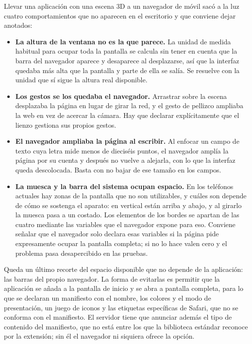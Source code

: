 Llevar una aplicación con una escena 3D a un navegador de móvil sacó a la luz cuatro
comportamientos que no aparecen en el escritorio y que conviene dejar anotados:

\begin{itemize}
	\item \textbf{La altura de la ventana no es la que parece.} La unidad de medida habitual para
		ocupar toda la pantalla se calcula sin tener en cuenta que la barra del navegador aparece y
		desaparece al desplazarse, así que la interfaz quedaba más alta que la pantalla y parte de
		ella se salía. Se resuelve con la unidad que sí sigue la altura real disponible.
	\item \textbf{Los gestos se los quedaba el navegador.} Arrastrar sobre la escena desplazaba la
		página en lugar de girar la red, y el gesto de pellizco ampliaba la web en vez de acercar la
		cámara. Hay que declarar explícitamente que el lienzo gestiona sus propios gestos.
	\item \textbf{El navegador ampliaba la página al escribir.} Al enfocar un campo de texto cuya
		letra mide menos de dieciséis puntos, el navegador amplía la página por su cuenta y después
		no vuelve a alejarla, con lo que la interfaz queda descolocada. Basta con no bajar de ese
		tamaño en los campos.
	\item \textbf{La muesca y la barra del sistema ocupan espacio.} En los teléfonos actuales hay
		zonas de la pantalla que no son utilizables, y cuáles son depende de cómo se sostenga el
		aparato: en vertical están arriba y abajo, y al girarlo la muesca pasa a un costado. Los
		elementos de los bordes se apartan de las cuatro mediante las variables que el navegador
		expone para eso. Conviene señalar que el navegador solo declara esas variables si la página
		pide expresamente ocupar la pantalla completa; si no lo hace valen cero y el problema pasa
		desapercibido en las pruebas.
\end{itemize}

Queda un último recorte del espacio disponible que no depende de la aplicación: las barras del propio
navegador. La forma de evitarlas es permitir que la aplicación se añada a la pantalla de inicio y se
abra a pantalla completa, para lo que se declaran un manifiesto con el nombre, los colores y el modo
de presentación, un juego de iconos y las etiquetas específicas de Safari, que no se conforma con el
manifiesto. El servidor tiene que anunciar además el tipo de contenido del manifiesto, que no está
entre los que la biblioteca estándar reconoce por la extensión; sin él el navegador ni siquiera
ofrece la opción.

